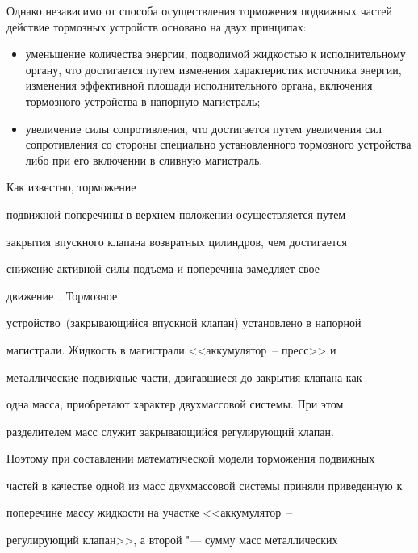 Однако независимо от способа осуществления торможения подвижных частей действие тормозных устройств основано на двух принципах:



\begin{itemize}

\item уменьшение количества энергии, подводимой жидкостью к исполнительному органу, что достигается путем изменения характеристик источника энергии, изменения эффективной площади исполнительного органа, включения тормозного устройства в напорную магистраль;

\item увеличение силы сопротивления, что достигается путем увеличения сил сопротивления со стороны специально установленного тормозного уст\-ройства либо при его включении в сливную магистраль.

\end{itemize}



\smallskip



 Как известно, торможение

подвижной поперечины в верхнем положении осуществляется  путем

закрытия впускного клапана возвратных цилиндров, чем достигается

снижение активной силы подъема и поперечина замедляет свое

движение~\cite{korchak:bib:Tula}. Тормозное

устройство~(закрывающийся впускной клапан) установлено в напорной

магистрали. Жидкость в магистрали <<аккумулятор~-- пресс>>  и

металлические подвижные части, двигавшиеся до закрытия клапана как

одна масса, приобретают характер двухмассовой системы. При этом

разделителем масс служит закрывающийся регулирующий клапан.

Поэтому при составлении математической модели торможения подвижных

частей в качестве одной из масс двухмассовой системы приняли приведенную к

поперечине массу жидкости на  участке <<аккумулятор~--

регулирующий клапан>>, а второй "--- сумму масс металлических

